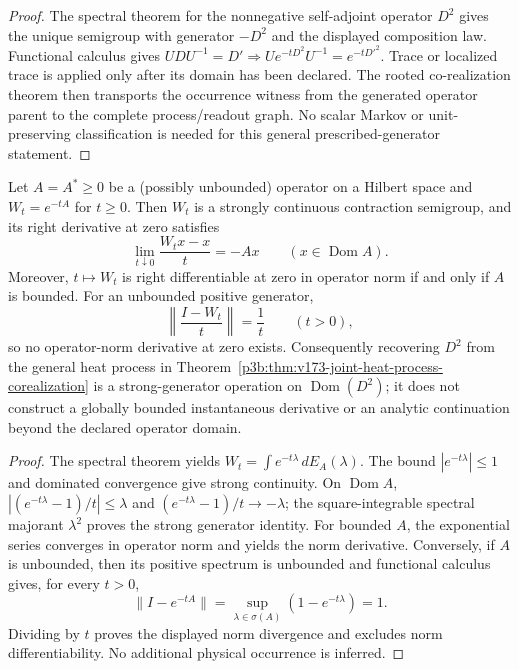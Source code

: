\documentclass[12pt,a4paper]{article}
\begin{document}
\begin{proof}
The spectral theorem for the nonnegative self-adjoint operator \(D^2\) gives
the unique semigroup with generator \(-D^2\) and the displayed composition
law.  Functional calculus gives
\(UDU^{-1}=D'\Rightarrow Ue^{-tD^2}U^{-1}=e^{-tD'^2}\).  Trace or localized
trace is applied only after its domain has been declared.  The rooted
co-realization theorem then transports the occurrence witness from the
generated operator parent to the complete process/readout graph.  No scalar
Markov or unit-preserving classification is needed for this general
prescribed-generator statement.
\end{proof}

\begin{proposition}
\label{p3b:prop:v284-heat-generator-domain}
Let $A=A^*\geq0$ be a (possibly unbounded) operator on a Hilbert space
and $W_t=e^{-tA}$ for $t\geq0$.  Then $W_t$ is a strongly continuous
contraction semigroup, and its right derivative at zero satisfies
\[
 \lim_{t\downarrow0}\frac{W_tx-x}{t}=-Ax
 \qquad(x\in\operatorname{Dom}A).
\]
Moreover, $t\mapsto W_t$ is right differentiable at zero in operator norm
if and only if $A$ is bounded.  For an unbounded positive generator,
\[
 \left\|\frac{I-W_t}{t}\right\|=\frac1t\qquad(t>0),
\]
so no operator-norm derivative at zero exists.  Consequently recovering
$D^2$ from the general heat process in
Theorem~\ref{p3b:thm:v173-joint-heat-process-corealization}
is a strong-generator operation on $\operatorname{Dom}(D^2)$; it does not
construct a globally bounded instantaneous derivative or an analytic
continuation beyond the declared operator domain.
\end{proposition}

\begin{proof}
The spectral theorem yields $W_t=\int e^{-t\lambda}\,dE_A(\lambda)$.
The bound $|e^{-t\lambda}|\leq1$ and dominated convergence give strong
continuity.  On $\operatorname{Dom}A$,
$|(e^{-t\lambda}-1)/t|\leq\lambda$ and
$(e^{-t\lambda}-1)/t\to-\lambda$; the square-integrable spectral
majorant $\lambda^2$ proves the strong generator identity.  For bounded
$A$, the exponential series converges in operator norm and yields the
norm derivative.  Conversely, if $A$ is unbounded, then its positive
spectrum is unbounded and functional calculus gives, for every $t>0$,
\[
 \|I-e^{-tA}\|=\sup_{\lambda\in\sigma(A)}(1-e^{-t\lambda})=1.
\]
Dividing by $t$ proves the displayed norm divergence and excludes
norm differentiability.  No additional physical occurrence is inferred.
\end{proof}
\end{document}
